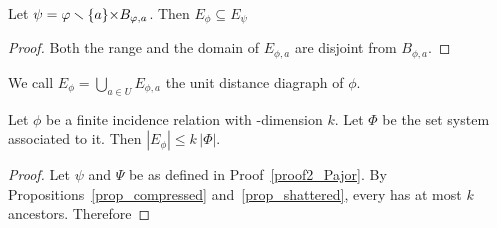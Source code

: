 \documentclass[sputnik.tex]{subfiles}
\begin{document}
\begin{proposition}\label{prop_udd1} 
Let $\psi=\varphi\smallsetminus\{a\}{\times}B_{\varphi,a}$. Then $E_\phi\subseteq E_{\psi}$
\end{proposition}
\begin{proof}Both the range and the domain of $E_{\phi,a}$ are disjoint from $B_{\phi,a}$.
\end{proof}

We call $\displaystyle E_\phi=\bigcup_{a\in U}E_{\phi,a}$ the unit distance diagraph of $\phi$. 

\begin{proposition}
Let $\phi$ be a finite incidence relation with \vc-dimension $k$.
Let $\Phi$ be the set system associated to it. 
Then $|E_\phi|\le k\,|\Phi|$.
\end{proposition}

\begin{proof}
Let $\psi$ and $\Psi$ be as defined in Proof~\ref{proof2_Pajor}.
By Propositions~\ref{prop_compressed} and~\ref{prop_shattered}, every has at most $k$ ancestors.
Therefore

\end{proof}
\end{document}
